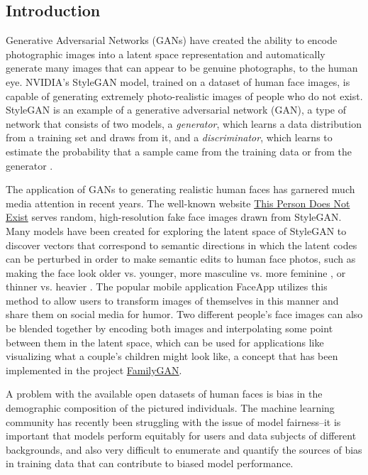 \documentclass[11pt, letterpaper]{article}
\begin{document}
\begin{multicols}{2}
  \section{Introduction}

  Generative Adversarial Networks (GANs) have created the ability to encode
  photographic images into a latent space representation and automatically
  generate many images that can appear to be genuine photographs, to the human
  eye. NVIDIA's StyleGAN\cite{stylegan} model, trained on a dataset of human
  face images, is capable of generating extremely photo-realistic images of
  people who do not exist. StyleGAN is an example of a generative adversarial
  network (GAN), a type of network that consists of two models, a
  \emph{generator}, which learns a data distribution from a training set and
  draws from it, and a \emph{discriminator}, which learns to estimate the
  probability that a sample came from the training data or from the generator
  \cite{goodfellow2014generative}.

  The application of GANs to generating realistic human faces has garnered much
  media attention in recent years. The well-known website 
  \href{https://thispersondoesnotexist.com/}{This Person Does Not Exist} serves
  random, high-resolution fake face images drawn from StyleGAN. Many models have
  been created for exploring the latent space of StyleGAN to discover vectors
  that correspond to semantic directions in which the latent codes can be 
  perturbed in order to make semantic edits to human face photos, such as making
  the face look older vs. younger, more masculine vs. more feminine 
  \cite{shen2020interpreting}, or thinner vs. heavier 
  \cite{pinnimty2020transforming}. The popular mobile application FaceApp
  utilizes this method to allow users to transform images of themselves in this
  manner and share them on social media for humor. Two different people's face
  images can also be blended together by encoding both images and interpolating
  some point between them in the latent space, which can be used for applications
  like visualizing what a couple's children might look like, a concept that
  has been implemented in the project
  \href{https://medium.com/swlh/familygan-generating-a-childs-face-using-his-parents-394d8face6a4}{FamilyGAN}.

  A problem with the available open datasets of human faces is bias in the
  demographic composition of the pictured individuals. The machine learning
  community has recently been struggling with the issue of model fairness--it is
  important that models perform equitably for users and data subjects of 
  different backgrounds, and also very difficult to enumerate and quantify the 
  sources of bias in training data that can contribute to biased model
  performance.


\end{multicols}
\end{document}

